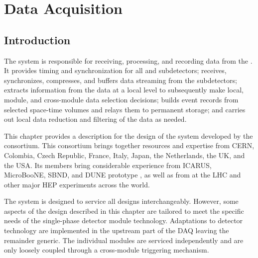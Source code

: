 \chapter{Data Acquisition}
\label{ch:sp-daq}

\section{Introduction}
\label{sec:fd-daq:introduction}

The   system is responsible for receiving,
processing, and recording data from the  .
It provides
timing and synchronization for all  and
subdetectors; receives, synchronizes, compresses, and buffers data
streaming from the subdetectors; extracts information from the data at a
local level to subsequently make local, module, and cross-module data
selection decisions; builds event records %
 from selected space-time volumes 
and relays them to permanent storage; and carries out local data
reduction and filtering of the data as needed.

This chapter provides a description for the design of the 
  system developed by the  
 consortium. 
This consortium brings together resources and expertise from CERN,
Colombia, Czech Republic, France, Italy, Japan, the Netherlands, the UK, and the USA. 
Its members bring considerable experience from ICARUS, MicroBooNE,
SBND, and
DUNE prototype , as well as from  at the LHC and other major
HEP experiments across the world.

The system is designed to service all   designs
interchangeably.  However, some aspects of the  design described in
this chapter are tailored to meet the specific needs of the single-phase
detector module technology.  Adaptations to detector technology are
implemented in the upstream part of the DAQ leaving the remainder generic. The
individual modules are serviced independently and are only loosely
coupled through a cross-module triggering mechanism.

